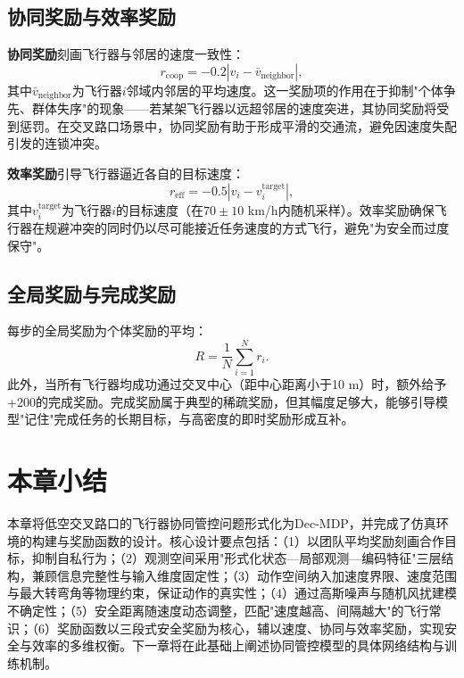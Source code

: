 \documentclass[12pt,a4paper,UTF8]{ctexbook}
\begin{document}
\subsection{协同奖励与效率奖励}

\textbf{协同奖励}刻画飞行器与邻居的速度一致性：
\begin{equation}
    r_{\text{coop}} = -0.2\left|v_i - \bar{v}_{\text{neighbor}}\right|,
    \label{eq:reward_coop}
\end{equation}
其中$\bar{v}_{\text{neighbor}}$为飞行器$i$邻域内邻居的平均速度。这一奖励项的作用在于抑制"个体争先、群体失序"的现象——若某架飞行器以远超邻居的速度突进，其协同奖励将受到惩罚。在交叉路口场景中，协同奖励有助于形成平滑的交通流，避免因速度失配引发的连锁冲突。

\textbf{效率奖励}引导飞行器逼近各自的目标速度：
\begin{equation}
    r_{\text{eff}} = -0.5\left|v_i - v_i^{\text{target}}\right|,
    \label{eq:reward_eff}
\end{equation}
其中$v_i^{\text{target}}$为飞行器$i$的目标速度（在$70\pm10$ km/h内随机采样）。效率奖励确保飞行器在规避冲突的同时仍以尽可能接近任务速度的方式飞行，避免"为安全而过度保守"。

\subsection{全局奖励与完成奖励}

每步的全局奖励为个体奖励的平均：
\begin{equation}
    R = \frac{1}{N}\sum_{i=1}^{N} r_i.
    \label{eq:reward_global}
\end{equation}
此外，当所有飞行器均成功通过交叉中心（距中心距离小于10 m）时，额外给予+200的完成奖励。完成奖励属于典型的稀疏奖励，但其幅度足够大，能够引导模型"记住"完成任务的长期目标，与高密度的即时奖励形成互补。

\section{本章小结}

本章将低空交叉路口的飞行器协同管控问题形式化为Dec-MDP，并完成了仿真环境的构建与奖励函数的设计。核心设计要点包括：（1）以团队平均奖励刻画合作目标，抑制自私行为；（2）观测空间采用"形式化状态—局部观测—编码特征"三层结构，兼顾信息完整性与输入维度固定性；（3）动作空间纳入加速度界限、速度范围与最大转弯角等物理约束，保证动作的真实性；（4）通过高斯噪声与随机风扰建模不确定性；（5）安全距离随速度动态调整，匹配"速度越高、间隔越大"的飞行常识；（6）奖励函数以三段式安全奖励为核心，辅以速度、协同与效率奖励，实现安全与效率的多维权衡。下一章将在此基础上阐述协同管控模型的具体网络结构与训练机制。
\end{document}
